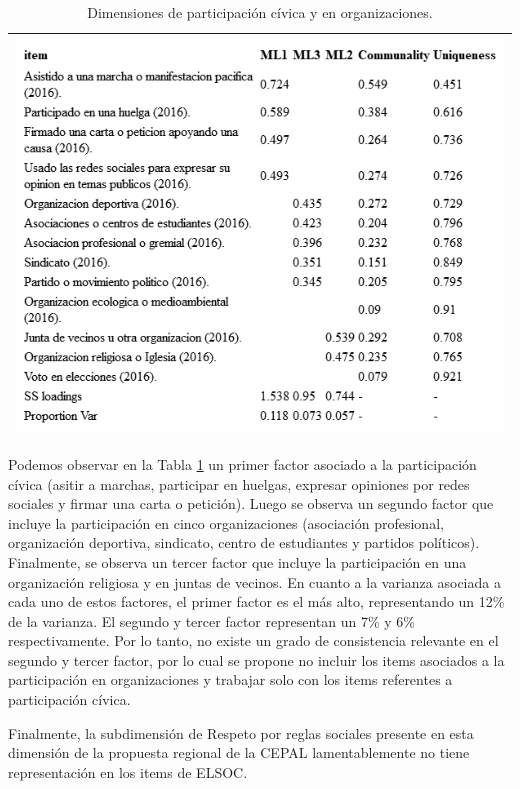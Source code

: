 \documentclass[
  12pt,
]{book}
\begin{document}
\begin{longtable}[]{@{}l@{}}
\caption{\label{tab:participacion-fa}Dimensiones de participación cívica y en organizaciones.}\tabularnewline
\toprule
\endhead
\includegraphics[width=6.77083in,height=\textheight]{output/tables/participacion_fa.png}\tabularnewline
\bottomrule
\end{longtable}

Podemos observar en la Tabla \ref{tab:participacion-fa} un primer factor asociado a la participación cívica (asitir a marchas, participar en huelgas, expresar opiniones por redes sociales y firmar una carta o petición). Luego se observa un segundo factor que incluye la participación en cinco organizaciones (asociación profesional, organización deportiva, sindicato, centro de estudiantes y partidos políticos). Finalmente, se observa un tercer factor que incluye la participación en una organización religiosa y en juntas de vecinos. En cuanto a la varianza asociada a cada uno de estos factores, el primer factor es el más alto, representando un 12\% de la varianza. El segundo y tercer factor representan un 7\% y 6\% respectivamente. Por lo tanto, no existe un grado de consistencia relevante en el segundo y tercer factor, por lo cual se propone no incluir los items asociados a la participación en organizaciones y trabajar solo con los items referentes a participación cívica.

Finalmente, la subdimensión de Respeto por reglas sociales presente en esta dimensión de la propuesta regional de la CEPAL lamentablemente no tiene representación en los items de ELSOC.
\end{document}
